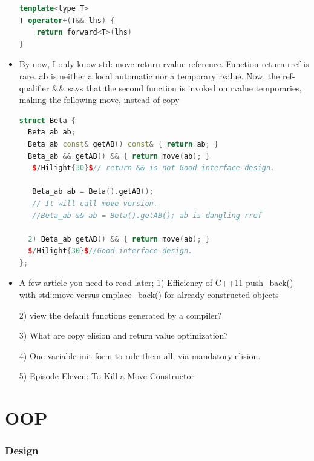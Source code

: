 \documentclass[a4paper,12pt,twoside]{book}
\begin{document}
\begin{itemize}
\begin{lstlisting}[frame=single, language=c++]
template<type T>
T operator+(T&& lhs) {
    return forward<T>(lhs)
}
\end{lstlisting}

\item By now, I only know std::move return rvalue reference.  Function return rref is rare. ab is neither a local automatic nor a temporary rvalue. Now, the ref-qualifier \&\& says that the second function is invoked on rvalue temporaries, making the following move, instead of copy

\begin{lstlisting}[frame=single, language=c++]
struct Beta {
  Beta_ab ab;
  Beta_ab const& getAB() const& { return ab; }
  Beta_ab && getAB() && { return move(ab); }
   $/Hilight{30}$// return && is not Good interface design.

   Beta_ab ab = Beta().getAB();
   // It will call move version.
   //Beta_ab && ab = Beta().getAB(); ab is dangling rref

  2) Beta_ab getAB() && { return move(ab); }
  $/Hilight{30}$//Good interface design.
};
\end{lstlisting}

\item A few article you need to read later;
1) Efficiency of C++11 push\_back() with std::move versus emplace\_back() for already constructed objects

2) view the default functions generated by a compiler?

3) What are copy elision and return value optimization?

4) One variable init form to rule them all, via mandatory elision.

5) Episode Eleven: To Kill a Move Constructor

\end{itemize}


\chapter{OOP}
\subsection{Design}
\end{document}
